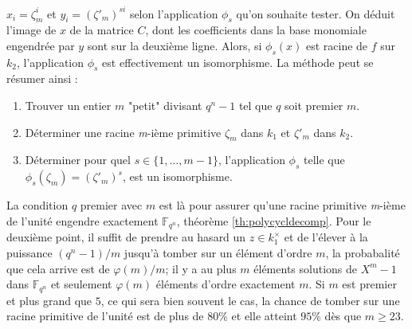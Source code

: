 \documentclass[a4paper]{article} %
\numberwithin{section}{part}
\numberwithin{equation}{section}
\newcommand\nroot[1]{\textit{#1}-ième}
\newcommand\GF[1]{\mathbb{F}_{#1}}
\begin{document}
$x_i = \zeta_m^i$ et $y_i = (\zeta'_m)^{si}$ selon l'application $\phi_s$ qu'on 
souhaite tester. On déduit l'image de $x$ de la matrice $C$, dont les 
coefficients dans la base monomiale engendrée par $y$ sont sur la deuxième 
ligne. Alors, si $\phi_s(x)$ est racine de $f$ sur $k_2$, l'application $\phi_s$
est effectivement un isomorphisme. La méthode peut se résumer ainsi :
\vspace{0.3cm}
\begin{enumerate}[1.]
\item Trouver un entier $m$ "petit" divisant $q^n - 1$ tel que 
$q$ soit premier $m$. 

\item Déterminer une racine \nroot{m} primitive $\zeta_m$ dans $k_1$ et
$\zeta'_m$ dans $k_2$.

\item  Déterminer pour quel $s\in \lbrace{1,\dots,m-1}\rbrace$, l'application
$\phi_s$ telle que $\phi_s(\zeta_m) = (\zeta'_m)^s$, est un isomorphisme.
\end{enumerate}
\vspace{0.3cm}
La condition $q$ premier avec $m$ est là pour assurer qu'une racine primitive
\nroot{m} de l'unité engendre exactement $\GF{q^n}$, théorème
\ref{th:polycycldecomp}. Pour le deuxième point, il suffit de prendre au hasard 
un $z\in k_1^{\times}$ et de l'élever à la puissance $(q^n - 1)/m$ jusqu'à 
tomber sur un élément d'ordre $m$, la probabalité que cela arrive est de 
$\varphi(m)/m$; il y a au plus $m$ éléments solutions de $X^m - 1$ dans 
$\GF{q^n}$ et seulement $\varphi(m)$ éléments d'ordre exactement $m$. Si $m$ est
premier et plus grand que $5$, ce qui sera bien souvent le cas, la chance de
tomber sur une racine primitive de l'unité est de plus de $80\%$ et elle atteint
$95\%$ dès que $m \geq 23$. 
\end{document}
